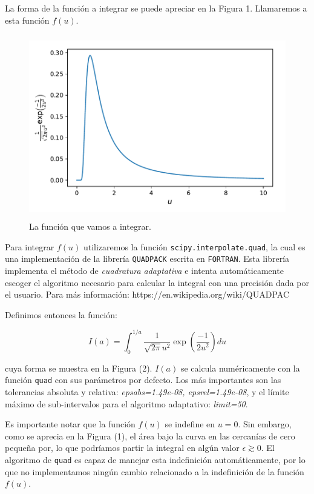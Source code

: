 \documentclass[letter, 11pt]{article}
\begin{document}
La forma de la función a integrar se puede apreciar en la Figura 1. Llamaremos
a esta función $f(u)$.

\begin{figure}[!ht]
  \centering
  \includegraphics[height=8cm]{../solucion/integral.pdf}
  \caption{La función que vamos a integrar.}
\end{figure}

Para integrar $f(u)$ utilizaremos la función \texttt{scipy.interpolate.quad},
la cual es una implementación de la librería \texttt{QUADPACK} escrita en
\texttt{FORTRAN}. Esta librería implementa el método de {\it cuadratura
adaptativa} e intenta automáticamente escoger el algoritmo necesario para
calcular la integral con una precisión dada por el usuario. Para más
información: https://en.wikipedia.org/wiki/QUADPAC

Definimos entonces la función:

\begin{equation}
  I(a) =  \int_0^{1/a} \frac{1}{\sqrt{2\pi}u^2} \exp\left({\frac{-1}{2u^2}}\right) du
\end{equation}

cuya forma se muestra en la Figura (2). $I(a)$ se calcula numéricamente con la
función \texttt{quad} con sus parámetros por defecto. Los más importantes son
las tolerancias absoluta y relativa: {\it epsabs=1.49e-08, epsrel=1.49e-08}, y
el límite máximo de sub-intervalos para el algoritmo adaptativo: {\it
limit=50}.

Es importante notar que la función $f(u)$ se indefine en $u=0$. Sin embargo,
como se aprecia en la Figura (1), el área bajo la curva en las cercanías de
cero pequeña por, lo que podríamos partir la integral en algún valor $\epsilon
\gtrsim 0$. El algoritmo de \texttt{quad} es capaz de manejar esta indefinición
automáticamente, por lo que no implementamos ningún cambio relacionado a la
indefinición de la función $f(u)$.
\end{document}
